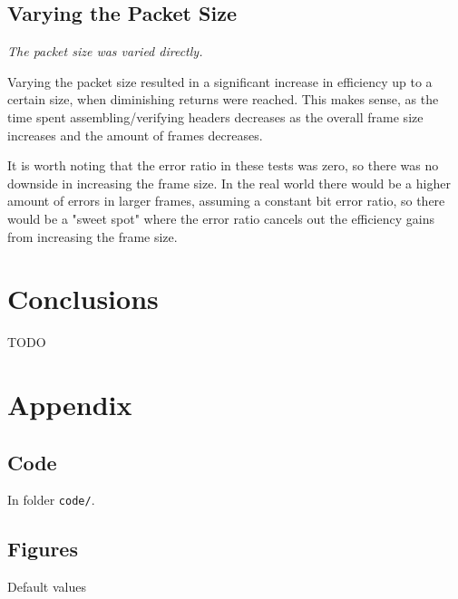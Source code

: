 \documentclass[11pt,a4paper,twocolumn]{article}
\begin{document}
\subsection{Varying the Packet Size}

\textit{The packet size was varied directly.}

Varying the packet size resulted in a significant increase in efficiency up to a certain size, when diminishing returns were reached.
This makes sense, as the time spent assembling/verifying headers decreases as the overall frame size increases and the amount of frames decreases.

It is worth noting that the error ratio in these tests was zero, so there was no downside in increasing the frame size.
In the real world there would be a higher amount of errors in larger frames, assuming a constant bit error ratio, so there would be a "sweet spot" where the error ratio cancels out the efficiency gains from increasing the frame size.

\section{Conclusions}

TODO

\onecolumn
\appendix
\section{Appendix}

\subsection{Code}

\noindent In folder \lstinline{code/}.

\subsection{Figures}
\label{sec:a2}


\begin{table}[h!]
    \centering
    \caption{Default values}
\end{table}
\end{document}

